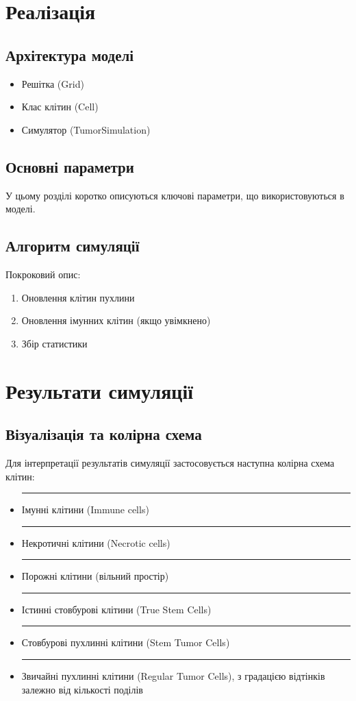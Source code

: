 \documentclass{article}
\begin{document}
\section{Реалізація}
\subsection{Архітектура моделі}
\begin{itemize}
    \item Решітка (Grid)
    \item Клас клітин (Cell)
    \item Симулятор (TumorSimulation)
\end{itemize}

\subsection{Основні параметри}

У цьому розділі коротко описуються ключові параметри, що використовуються в моделі.

\subsection{Алгоритм симуляції}
Покроковий опис:
\begin{enumerate}
    \item Оновлення клітин пухлини
    \item Оновлення імунних клітин (якщо увімкнено)
    \item Збір статистики
\end{enumerate}

\section{Результати симуляції}

\subsection{Візуалізація та колірна схема}

Для інтерпретації результатів симуляції застосовується наступна колірна схема клітин:

\begin{itemize}
    \item \textcolor{blue}{\rule{1em}{1em}} Імунні клітини (Immune cells)
    \item \textcolor{orange}{\rule{1em}{1em}} Некротичні клітини (Necrotic cells)
    \item \textcolor{gray}{\rule{1em}{1em}} Порожні клітини (вільний простір)
    \item \textcolor{yellow}{\rule{1em}{1em}} Істинні стовбурові клітини (True Stem Cells)
    \item \textcolor{green}{\rule{1em}{1em}} Стовбурові пухлинні клітини (Stem Tumor Cells)
    \item \textcolor{red}{\rule{1em}{1em}} Звичайні пухлинні клітини (Regular Tumor Cells), з градацією відтінків залежно від кількості поділів
\end{itemize}
\end{document}
